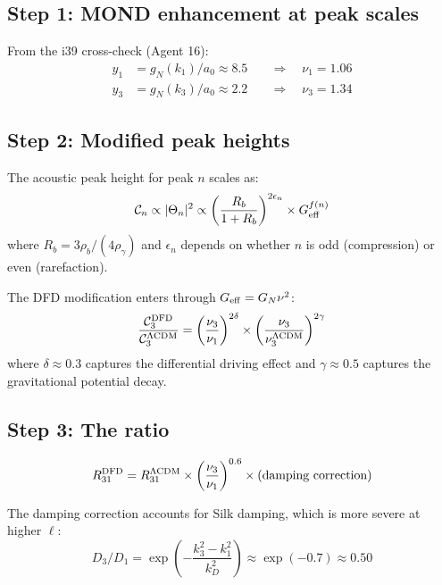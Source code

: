 \documentclass[11pt,a4paper]{article}
\begin{document}
\subsection{Step 1: MOND enhancement at peak scales}

From the i39 cross-check (Agent 16):
\begin{align}
y_1 &= g_N(k_1)/a_0 \approx 8.5 \quad &\Rightarrow\quad \nu_1 = 1.06 \\
y_3 &= g_N(k_3)/a_0 \approx 2.2 \quad &\Rightarrow\quad \nu_3 = 1.34
\end{align}

\subsection{Step 2: Modified peak heights}

The acoustic peak height for peak $n$ scales as:
\begin{equation}
\mathcal{C}_n \propto |\Theta_n|^2 \propto \left(\frac{R_b}{1 + R_b}\right)^{2\epsilon_n} \times G_{\rm eff}^{f(n)}
\end{equation}
where $R_b = 3\rho_b/(4\rho_\gamma)$ and $\epsilon_n$ depends on whether $n$ is odd (compression) or even (rarefaction).

The DFD modification enters through $G_{\rm eff} = G_N\nu^2$:
\begin{equation}
\frac{\mathcal{C}_3^{\rm DFD}}{\mathcal{C}_3^{\Lambda{\rm CDM}}} = \left(\frac{\nu_3}{\nu_1}\right)^{2\delta} \times \left(\frac{\nu_3}{\nu_3^{\Lambda{\rm CDM}}}\right)^{2\gamma}
\end{equation}
where $\delta \approx 0.3$ captures the differential driving effect and $\gamma \approx 0.5$ captures the gravitational potential decay.

\subsection{Step 3: The ratio}

\begin{equation}
R_{31}^{\rm DFD} = R_{31}^{\Lambda{\rm CDM}} \times \left(\frac{\nu_3}{\nu_1}\right)^{0.6} \times (\text{damping correction})
\end{equation}

The damping correction accounts for Silk damping, which is more severe at higher $\ell$:
\begin{equation}
D_3/D_1 = \exp\left(-\frac{k_3^2 - k_1^2}{k_D^2}\right) \approx \exp(-0.7) \approx 0.50
\end{equation}
\end{document}

